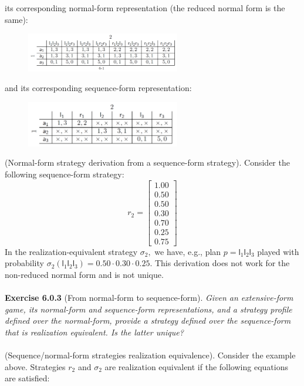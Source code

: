 \noindent
its corresponding normal-form representation (the reduced normal form is the same):
\begin{figure}[H]
\centering
\includegraphics[width=0.6\textwidth]{images/img_1_6_02.png}
\end{figure}
\noindent
and its corresponding sequence-form representation:
\begin{figure}[H]
\centering
\includegraphics[width=0.6\textwidth]{images/img_1_6_03.png}
\end{figure}
\noindent
(Normal-form strategy derivation from a sequence-form strategy). Consider the following sequence-form strategy:
$$ 
r_{2}=\left[\begin{array}{c}
1.00 \\
0.50 \\
0.50 \\
0.30 \\
0.70 \\
0.25 \\
0.75
\end{array}\right]
$$
In the realization-equivalent strategy $\sigma_{2},$ we have, e.g., plan $p=\mathsf{l}_{1}\mathsf{l}_{2}\mathsf{l}_{3}$ played with probability $\sigma_{2}\left(\mathsf{l}_{1}\mathsf{l}_{2}\mathsf{l}_{3}\right)=0.50 \cdot 0.30 \cdot 0.25$. This derivation does not work for the non-reduced normal form and is not unique.\\\\
\textbf{Exercise 6.0.3} (From normal-form to sequence-form). \textit{Given an extensive-form game, its normal-form and sequence-form representations, and a strategy profile defined over the normal-form, provide a strategy defined over the sequence-form that is realization equivalent. Is the latter unique?}\\\\
(Sequence/normal-form strategies realization equivalence). Consider the example above. Strategies $r_2$ and $\sigma_2$ are realization equivalent if the following equations are satisfied:
